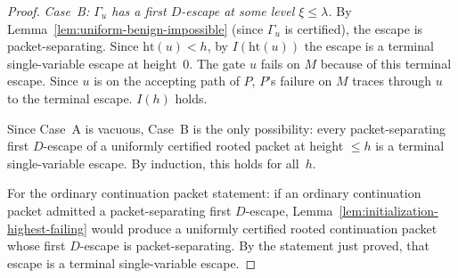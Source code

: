 \documentclass[11pt]{article}
\begin{document}
\begin{proof}
\emph{Case~B: $\Gamma_u$ has a first $D$-escape at some level
$\xi \le \lambda$.}
By Lemma~\ref{lem:uniform-benign-impossible} (since $\Gamma_u$ is
certified), the escape is packet-separating.  Since
$\mathrm{ht}(u) < h$, by $I(\mathrm{ht}(u))$ the escape is a terminal
single-variable escape at height~$0$.  The gate $u$ fails on $M$
because of this terminal escape.  Since $u$ is on the accepting path
of $P$, $P$'s failure on $M$ traces through $u$ to the terminal
escape.  $I(h)$ holds.

\medskip

Since Case~A is vacuous, Case~B is the only possibility: every
packet-separating first $D$-escape of a uniformly certified rooted
packet at height $\le h$ is a terminal single-variable escape.
By induction, this holds for all~$h$.

For the ordinary continuation packet statement: if an ordinary
continuation packet admitted a packet-separating first $D$-escape,
Lemma~\ref{lem:initialization-highest-failing} would produce a uniformly
certified rooted continuation packet whose first $D$-escape is
packet-separating.  By the statement just proved, that escape
is a terminal single-variable escape.
\end{proof}
\end{document}
